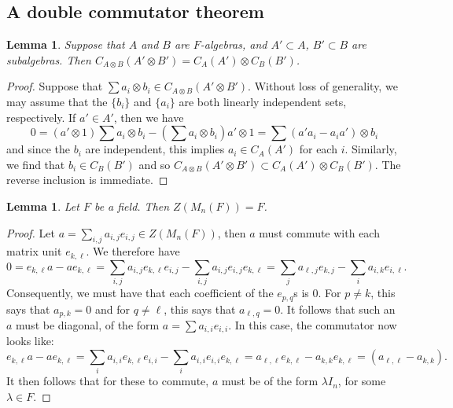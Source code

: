 \documentclass[12pt]{report}
\theoremstyle{plain}
\newtheorem{lem}[thm]{Lemma}
\begin{document}
\subsection{A double commutator theorem}


\begin{lem} \label{tensor commutators}
Suppose that $A$ and $B$ are $F$-algebras, and $A' \subset A$, $B' \subset
B$ are subalgebras. Then $C_{A \otimes B}(A' \otimes B') = C_A(A') \otimes
C_B(B')$.
\end{lem}
\begin{proof}
Suppose that $\sum a_i \otimes b_i \in C_{A \otimes B}(A' \otimes B')$.
Without loss of generality, we may assume that the $\{b_i\}$ and $\{a_i\}$ are
both linearly independent sets, respectively. If
$a' \in A'$, then we have
\[ 0 = (a' \otimes 1) \sum a_i \otimes b_i - \left(\sum a_i \otimes
b_i\right) a' \otimes 1 = \sum (a'a_i - a_i a') \otimes b_i \]
and since the $b_i$ are independent, this implies $a_i \in C_A(A')$ for
each $i$.
Similarly, we find that $b_i \in C_B(B')$ and so $C_{A \otimes B}(A'
\otimes B') \subset C_A(A') \otimes C_B(B')$. The reverse inclusion is
immediate.
\end{proof}


\begin{lem}
Let $F$ be a field. Then $Z(M_n(F)) = F$.
\end{lem}
\begin{proof}
Let $a = \sum_{i,j} a_{i,j} e_{i,j} \in Z(M_n(F))$,
then $a$ must commute with each matrix unit $e_{k,\ell}$. 
We therefore have 
\[0 = e_{k,\ell} a - a e_{k, \ell} = \sum_{i,j} a_{i,j} e_{k, \ell} e_{i,j} -
\sum_{i,j} a_{i,j} e_{i,j} e_{k,\ell} = \sum_j a_{\ell, j} e_{k, j} -
\sum_i a_{i, k} e_{i,\ell}.\]
Consequently, we must have that each coefficient of the $e_{p, q}$s is $0$.
For $p \neq k$, this says that $a_{p, k} = 0$ and for $q \neq \ell$, this
says that $a_{\ell, q} = 0$.  It follows that such an $a$ must be diagonal,
of the form $a = \sum a_{i,i} e_{i,i}$. In this case, the commutator now
looks like:
\[e_{k,\ell} a - a e_{k, \ell} = \sum_{i} a_{i,i} e_{k, \ell} e_{i,i} -
\sum_{i} a_{i,i} e_{i,i} e_{k,\ell} = a_{\ell, \ell} e_{k, \ell} - a_{k, k}
e_{k, \ell} = (a_{\ell, \ell} - a_{k,k}).\]
It then follows that for these to commute, $a$ must be of the form $\lambda
I_n$, for some $\lambda \in F$. 
\end{proof}
\end{document}

